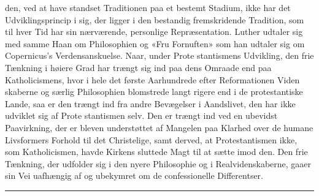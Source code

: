 \documentclass[12pt,a4paper]{book}
\newcommand{\divrule}{\begin{center}\rule{2cm}{0.4pt}\end{center}}
\begin{document}
den, ved at have standset Traditionen paa et bestemt Stadium,
ikke har det Udviklingsprincip i sig, der ligger i den bestandig
fremskridende Tradition, som til hver Tid har sin nærværende,
personlige Repræsentation. Luther udtaler sig med samme
Haan om Philosophien og «Fru Fornuften» som han udtaler
sig om Copernicus's Verdensanskuelse. Naar, under Prote\-%
stantismens Udvikling, den frie Tænkning i høiere Grad har
trængt sig ind paa dens Omraade end paa Katholicismens,
hvor i hele det første Aarhundrede efter Reformationen Viden\-%
skaberne og særlig Philosophien blomstrede langt rigere end i
de protestantiske Lande, saa er den trængt ind fra andre
Bevægelser i Aandslivet, den har ikke udviklet sig af Prote\-%
stantismen selv. Den er trængt ind ved en ubevidst Paavirkning,
der er bleven understøttet af Mangelen paa Klarhed over de
humane Livsformers Forhold til det Christelige, samt derved,
at Protestantismen ikke, som Katholicismen, havde Kirkens
sluttede Magt til at sætte imod den. Den frie Tænkning, der
udfolder sig i den nyere Philosophie og i Realvidenskaberne,
gaaer sin Vei uafhængig af og ubekymret om de confessionelle
Differentser.

\divrule
\end{document}
